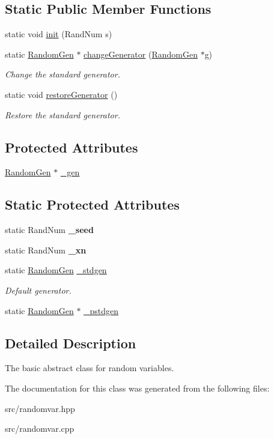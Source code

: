\subsection*{Static Public Member Functions}
\begin{DoxyCompactItemize}
\item 
static void \hyperlink{group__metasim__random_ga89cf38f1fd1b6cfd67ae022f6874f82e}{init} (Rand\+Num s)
\item 
static \hyperlink{classMetaSim_1_1RandomGen}{Random\+Gen} $\ast$ \hyperlink{group__metasim__random_gaeb0c73814132d1d0631264ec94bbf9bc}{change\+Generator} (\hyperlink{classMetaSim_1_1RandomGen}{Random\+Gen} $\ast$g)
\begin{DoxyCompactList}\small\item\em Change the standard generator. \end{DoxyCompactList}\item 
static void \hyperlink{group__metasim__random_ga606bcdbc13861b87d0857a1af29ad07e}{restore\+Generator} ()
\begin{DoxyCompactList}\small\item\em Restore the standard generator. \end{DoxyCompactList}\end{DoxyCompactItemize}
\subsection*{Protected Attributes}
\begin{DoxyCompactItemize}
\item 
\hyperlink{classMetaSim_1_1RandomGen}{Random\+Gen} $\ast$ \hyperlink{group__metasim__random_ga64ccafdc8f32743c6b6bba7bfc1df4ff}{\+\_\+gen}
\end{DoxyCompactItemize}
\subsection*{Static Protected Attributes}
\begin{DoxyCompactItemize}
\item 
static Rand\+Num {\bfseries \+\_\+seed}
\item 
static Rand\+Num {\bfseries \+\_\+xn}
\item 
static \hyperlink{classMetaSim_1_1RandomGen}{Random\+Gen} \hyperlink{group__metasim__random_ga074de34f085259b7b9911e9f0a808d6b}{\+\_\+stdgen}
\begin{DoxyCompactList}\small\item\em Default generator. \end{DoxyCompactList}\item 
static \hyperlink{classMetaSim_1_1RandomGen}{Random\+Gen} $\ast$ \hyperlink{group__metasim__random_ga920839e50710a224882a290bc132322d}{\+\_\+pstdgen}
\end{DoxyCompactItemize}


\subsection{Detailed Description}
The basic abstract class for random variables. 

The documentation for this class was generated from the following files\+:\begin{DoxyCompactItemize}
\item 
src/randomvar.\+hpp\item 
src/randomvar.\+cpp\end{DoxyCompactItemize}
